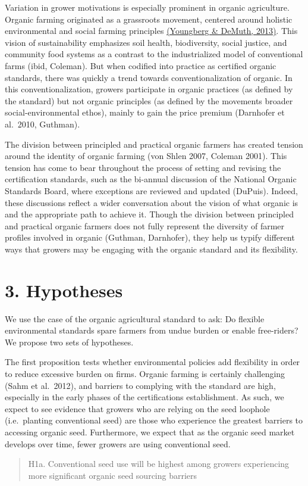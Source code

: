 \documentclass[twoside,12pt,final]{ucthesis-CA2012}
\begin{document}
\begin{ucmainmatter}
Variation in grower motivations is especially prominent in organic
agriculture. Organic farming originated as a grassroots movement,
centered around holistic environmental and social farming principles
\href{https://www.zotero.org/google-docs/?broken=hg5nRL}{(Youngberg \& DeMuth,
2013)}. This vision
of sustainability emphasizes soil health, biodiversity, social justice,
and community food systems as a contrast to the industrialized model of
conventional farms (ibid, Coleman). But when codified into practice as
certified organic standards, there was quickly a trend towards
\textquotesingle conventionalization\textquotesingle{} of organic. In this conventionalization, growers
participate in organic practices (as defined by the standard) but not
organic principles (as defined by the movement\textquotesingle s broader
social-environmental ethos), mainly to gain the price premium (Darnhofer
et al.~2010, Guthman).

The division between \textquotesingle principled\textquotesingle{} and \textquotesingle practical\textquotesingle{} organic farmers
has created tension around the identity of organic farming (von Shlen
2007, Coleman 2001). This tension has come to bear throughout the
process of setting and revising the certification standards, such as the
bi-annual discussion of the National Organic Standards Board, where
exceptions are reviewed and updated (DuPuis). Indeed, these discussions
reflect a wider conversation about the vision of what organic is and the
appropriate path to achieve it. Though the division between
\textquotesingle principled\textquotesingle{} and \textquotesingle practical\textquotesingle{} organic farmers does not fully
represent the diversity of farmer profiles involved in organic (Guthman,
Darnhofer), they help us typify different ways that growers may be
engaging with the organic standard and its flexibility.

\hypertarget{hypotheses}{%
\section{3. Hypotheses}\label{hypotheses}}

We use the case of the organic agricultural standard to ask: Do flexible
environmental standards spare farmers from undue burden or enable
free-riders? We propose two sets of hypotheses.

The first proposition tests whether environmental policies add
flexibility in order to reduce excessive burden on firms. Organic
farming is certainly challenging (Sahm et al.~2012), and barriers to
complying with the standard are high, especially in the early phases of
the certification\textquotesingle s establishment. As such, we expect to see evidence
that growers who are relying on the seed loophole (i.e.~planting
conventional seed) are those who experience the greatest barriers to
accessing organic seed. Furthermore, we expect that as the organic seed
market develops over time, fewer growers are using conventional seed.
\begin{quote}
H1a. Conventional seed use will be highest among growers experiencing
more significant organic seed sourcing barriers


\end{quote}
\end{ucmainmatter}
\end{document}
